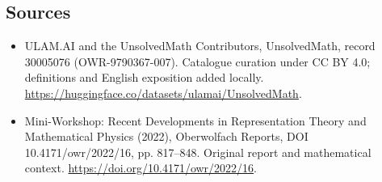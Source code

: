 \documentclass[11pt]{article}
\begin{document}
\subsection{Sources}
\begin{itemize}
\item[\hypertarget{source:30005076:1}{S1}] ULAM.AI and the UnsolvedMath Contributors, UnsolvedMath, record 30005076 (OWR-9790367-007). Catalogue curation under CC BY 4.0; definitions and English exposition added locally.
\url{https://huggingface.co/datasets/ulamai/UnsolvedMath}.
\item[\hypertarget{source:30005076:2}{S2}] Mini-Workshop: Recent Developments in Representation Theory and Mathematical Physics (2022), Oberwolfach Reports, DOI 10.4171/owr/2022/16, pp. 817--848. Original report and mathematical context.
\url{https://doi.org/10.4171/owr/2022/16}.
\end{itemize}
\label{end:30005076}
\end{document}
